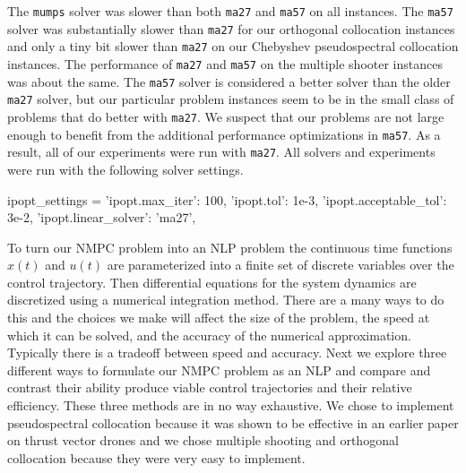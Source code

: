 \documentclass[]{article}
\newcommand{\nmpc}{NMPC}
\begin{document}
	The \texttt{mumps} solver was slower than both \texttt{ma27}  and  \texttt{ma57}  on all instances.  The \texttt{ma57} solver was substantially slower than \texttt{ma27} for our orthogonal collocation instances and only a tiny bit slower than \texttt{ma27} on our Chebyshev pseudospectral collocation instances. The performance of \texttt{ma27}  and  \texttt{ma57}  on  the multiple shooter instances was about the same.  The \texttt{ma57} solver is considered a better solver than the older  \texttt{ma27} solver, but our particular problem instances seem to be in the small class of problems that do better with  \texttt{ma27}. We suspect that our problems are not large enough to benefit from the additional performance optimizations in  \texttt{ma57}.  As a result, all of our experiments were run with  \texttt{ma27}. All solvers and experiments were run with the following solver settings.
	\vspace{\baselineskip}
	\begin{python}
		ipopt_settings = {
			'ipopt.max_iter': 100,                  
			'ipopt.tol': 1e-3,                      	
			'ipopt.acceptable_tol': 3e-2,
			'ipopt.linear_solver': 'ma27',
		}
	\end{python}
	\vspace{\baselineskip}
	To turn our {\nmpc} problem into an NLP problem  the continuous time functions $x(t)$ and $u(t)$ are parameterized into a finite set of discrete variables over the control trajectory.  Then differential equations for the system dynamics are discretized using a numerical integration method.  There are a many ways to do this and the choices we make will affect the size of the problem, the speed at which it can be solved, and the accuracy of the numerical approximation. Typically there is a tradeoff between speed and accuracy.  
	Next we explore three different ways to formulate our {\nmpc} problem as an NLP and compare and contrast their ability produce viable control trajectories and their relative efficiency.  These three methods are in no way exhaustive. We chose to implement pseudospectral collocation because it was shown to be effective in an earlier paper on thrust vector drones \citep{TVCDrone} and we chose multiple shooting and orthogonal collocation because they were very easy to implement.

	
\end{document}
